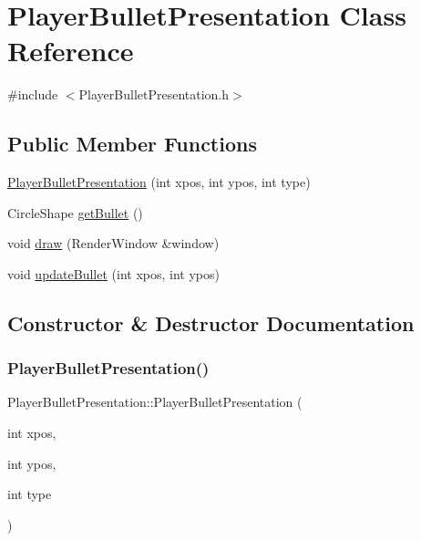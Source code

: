 \hypertarget{class_player_bullet_presentation}{}\section{Player\+Bullet\+Presentation Class Reference}
\label{class_player_bullet_presentation}


{\ttfamily \#include $<$Player\+Bullet\+Presentation.\+h$>$}

\subsection*{Public Member Functions}
\begin{DoxyCompactItemize}
\item 
\hyperlink{class_player_bullet_presentation_a23a5d5d48c4baf65bc2a9beea2a5e3ef}{Player\+Bullet\+Presentation} (int xpos, int ypos, int type)
\item 
Circle\+Shape \hyperlink{class_player_bullet_presentation_a1f41436f86e00e6f2de1c81d66218790}{get\+Bullet} ()
\item 
void \hyperlink{class_player_bullet_presentation_ad75fe9d4316fc438389e1f323ac2c646}{draw} (Render\+Window \&window)
\item 
void \hyperlink{class_player_bullet_presentation_ad8a28adf4326c03c52af77c7b91c5a0a}{update\+Bullet} (int xpos, int ypos)
\end{DoxyCompactItemize}


\subsection{Constructor \& Destructor Documentation}
\mbox{\label{class_player_bullet_presentation_a23a5d5d48c4baf65bc2a9beea2a5e3ef}} 
\subsubsection{\texorpdfstring{Player\+Bullet\+Presentation()}{PlayerBulletPresentation()}}
{\footnotesize\ttfamily Player\+Bullet\+Presentation\+::\+Player\+Bullet\+Presentation (\begin{DoxyParamCaption}\item[{int}]{xpos,  }\item[{int}]{ypos,  }\item[{int}]{type }\end{DoxyParamCaption})}




